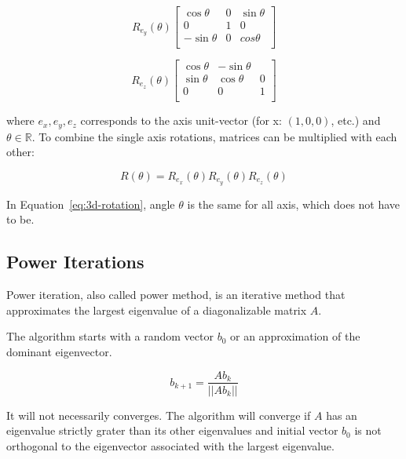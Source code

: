 \begin{equation}
    R_{e_y} (\theta)
    \begin{bmatrix}
        \cos \theta & 0 & \sin \theta\\
        0 & 1 & 0 \\
        - \sin \theta & 0 & cos \theta \\
    \end{bmatrix}
\end{equation}

\begin{equation}
    R_{e_z} (\theta)
    \begin{bmatrix}
        \cos \theta & - \sin \theta\\
        \sin \theta & \cos \theta & 0 \\
        0 & 0 & 1 \\
    \end{bmatrix}
\end{equation}

where $e_x, e_y, e_z$ corresponds to the axis unit-vector (for x: $(1,0,0)$, etc.) and $\theta \in \mathbb{R}$.
To combine the single axis rotations, matrices can be multiplied with each other:

\begin{equation}
    \label{eq:3d-rotation}
    R (\theta) = R_{e_x} (\theta) R_{e_y} (\theta) R_{e_z} (\theta)
\end{equation}

In Equation~\ref{eq:3d-rotation}, angle $\theta$ is the same for all axis, which does not have to be.


\subsection{Power Iterations}
\label{sec:powerIterations}

Power iteration, also called power method, is an iterative method
that approximates the largest eigenvalue of a diagonalizable matrix $A$.

The algorithm starts with a random vector $b_0$ or an approximation of the dominant eigenvector.

\begin{equation}
    \label{eq:powerIterations}
    b_{k+1} = \frac{Ab_k}{||Ab_k||}
\end{equation}

It will not necessarily converges. The algorithm will converge if $A$ has an eigenvalue strictly grater than its other eigenvalues
and initial vector $b_0$ is not orthogonal to the eigenvector associated with the largest eigenvalue.

